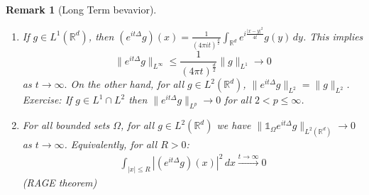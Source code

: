 \documentclass{report}
\theoremstyle{tommy}
\newtheorem{rem}[defn]{Remark}
\begin{document}
  \begin{rem}[Long Term bevavior]\
    \begin{enumerate}
      \item If \(g \in L^1(\mathbb{R}^d)\), then \((e^{it \Delta}g)(x) = \frac{1}{(4 \pi it)^{\frac{d}{2}}} \int_{\mathbb{R}^d} e^{i \frac{|x-y|^2}{4 t}} g(y) \, dy\). This implies 
      \[\|e^{it \Delta} g\|_{L^\infty} \le \frac{1}{(4 \pi t)^{\frac{d}{2}}} \|g\|_{L^1} \to 0\] as \(t \to \infty.\) On the other hand, for all \(g \in L^2(\mathbb{R}^d)\), \(\|e^{it \Delta} g\|_{L^2} = \|g\|_{L^2}\). \\
      Exercise: If \(g \in L^1 \cap L^2\) then \(\|e^{it \Delta} g\|_{L^p} \to 0\) for all \( 2 < p \le \infty\).
      \item For all bounded sets \(\Omega\), for all \(g \in L^2(\mathbb{R}^d)\) we have \(\|\mathbb{1}_\Omega e^{it \Delta} g\|_{L^2(\mathbb{R}^d)} \to 0\) as \(t \to \infty\). Equivalently, for all \(R > 0\):
      \begin{align*}
        \int_{|x| \le R} |(e^{it \Delta}g)(x)|^2 \, dx \xrightarrow{t \to \infty} 0
      \end{align*}
      (RAGE theorem)
    \end{enumerate}
  \end{rem}
\end{document}
